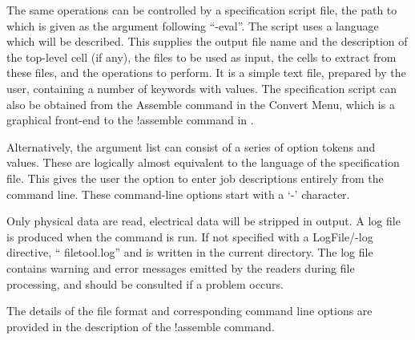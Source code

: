 The same operations can be controlled by a specification script file,
the path to which is given as the argument following ``{\vt -eval}''. 
The script uses a language which will be described.  This supplies
the output file name and the description of the top-level cell (if
any), the files to be used as input, the cells to extract from these
files, and the operations to perform.  It is a simple text file,
prepared by the user, containing a number of keywords with values. 
The specification script can also be obtained from the {\cb
Assemble} command in the {\cb Convert Menu}, which is a graphical
front-end to the {\cb !assemble} command in {\Xic}.

Alternatively, the argument list can consist of a series of option
tokens and values.  These are logically almost equivalent to the
language of the specification file.  This gives the user the option
to enter job descriptions entirely from the command line.  These
command-line options start with a `{\vt -}' character.

Only physical data are read, electrical data will be stripped in
output.  A log file is produced when the command is run.  If not
specified with a {\vt LogFile}/{\vt -log} directive, ``{\vt
filetool.log}'' and is written in the current directory.  The log file
contains warning and error messages emitted by the readers during file
processing, and should be consulted if a problem occurs.

The details of the file format and corresponding command line options
are provided in the description of the {\cb !assemble} command.

